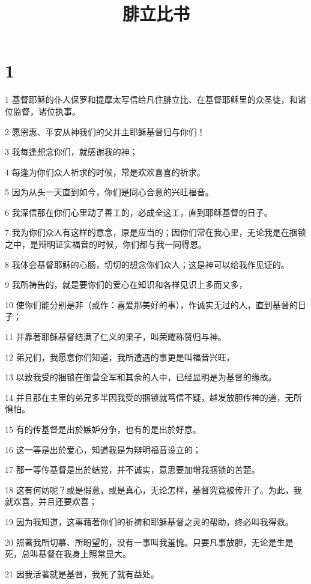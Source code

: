 

\title{腓立比书}


\chapter{1}

\par 1 基督耶稣的仆人保罗和提摩太写信给凡住腓立比、在基督耶稣里的众圣徒，和诸位监督，诸位执事。
\par 2 愿恩惠、平安从神我们的父并主耶稣基督归与你们！
\par 3 我每逢想念你们，就感谢我的神；
\par 4 每逢为你们众人祈求的时候，常是欢欢喜喜的祈求。
\par 5 因为从头一天直到如今，你们是同心合意的兴旺福音。
\par 6 我深信那在你们心里动了善工的，必成全这工，直到耶稣基督的日子。
\par 7 我为你们众人有这样的意念，原是应当的；因你们常在我心里，无论我是在捆锁之中，是辩明证实福音的时候，你们都与我一同得恩。
\par 8 我体会基督耶稣的心肠，切切的想念你们众人；这是神可以给我作见证的。
\par 9 我所祷告的，就是要你们的爱心在知识和各样见识上多而又多，
\par 10 使你们能分别是非（或作：喜爱那美好的事），作诚实无过的人，直到基督的日子；
\par 11 并靠著耶稣基督结满了仁义的果子，叫荣耀称赞归与神。
\par 12 弟兄们，我愿意你们知道，我所遭遇的事更是叫福音兴旺，
\par 13 以致我受的捆锁在御营全军和其余的人中，已经显明是为基督的缘故。
\par 14 并且那在主里的弟兄多半因我受的捆锁就笃信不疑，越发放胆传神的道，无所惧怕。
\par 15 有的传基督是出於嫉妒分争，也有的是出於好意。
\par 16 这一等是出於爱心，知道我是为辩明福音设立的；
\par 17 那一等传基督是出於结党，并不诚实，意思要加增我捆锁的苦楚。
\par 18 这有何妨呢？或是假意，或是真心，无论怎样，基督究竟被传开了。为此，我就欢喜，并且还要欢喜；
\par 19 因为我知道，这事藉著你们的祈祷和耶稣基督之灵的帮助，终必叫我得救。
\par 20 照著我所切慕、所盼望的，没有一事叫我羞愧。只要凡事放胆，无论是生是死，总叫基督在我身上照常显大。
\par 21 因我活著就是基督，我死了就有益处。
